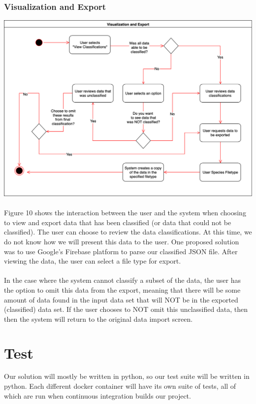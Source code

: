 \documentclass[12pt,oneside,letterpaper]{article}
\begin{document}
\subsubsection{Visualization and Export}
\includegraphics[scale = 0.40]{LandonExportActivityDiagram.png}
\begingroup
{}
\endgroup

\paragraph{}Figure 10 shows the interaction between the user and the system when choosing to view and export data that has been classified (or data that could not be classified). The user can choose to review the data classifications. At this time, we do not know how we will present this data to the user. One proposed solution was to use Google's Firebase platform to parse our classified JSON file. After viewing the data, the user can select a file type for export.

\paragraph{}In the case where the system cannot classify a subset of the data, the user has the option to omit this data from the export, meaning that there will be some amount of data found in the input data set that will NOT be in the exported (classified) data set. If the user chooses to NOT omit this unclassified data, then then the system will return to the original data import screen.

\section{Test}
Our solution will mostly be written in python, so our test suite will be written in python. Each different docker container will have its own suite of tests, all of which are run when continuous integration builds our project.
\end{document}
